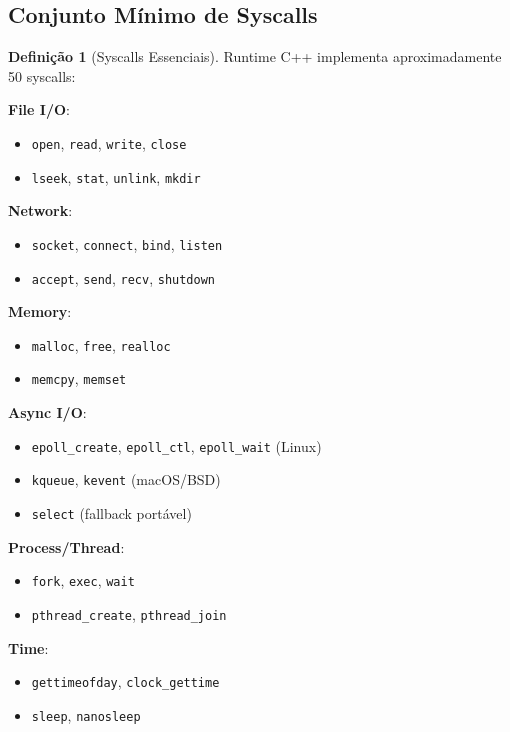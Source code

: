 \documentclass[12pt,a4paper]{article}
\theoremstyle{definition}
\newtheorem{definition}{Definição}[section]
\begin{document}
\subsection{Conjunto Mínimo de Syscalls}

\begin{definition}[Syscalls Essenciais]
Runtime C++ implementa aproximadamente 50 syscalls:

\textbf{File I/O}:
\begin{itemize}[noitemsep]
    \item \texttt{open}, \texttt{read}, \texttt{write}, \texttt{close}
    \item \texttt{lseek}, \texttt{stat}, \texttt{unlink}, \texttt{mkdir}
\end{itemize}

\textbf{Network}:
\begin{itemize}[noitemsep]
    \item \texttt{socket}, \texttt{connect}, \texttt{bind}, \texttt{listen}
    \item \texttt{accept}, \texttt{send}, \texttt{recv}, \texttt{shutdown}
\end{itemize}

\textbf{Memory}:
\begin{itemize}[noitemsep]
    \item \texttt{malloc}, \texttt{free}, \texttt{realloc}
    \item \texttt{memcpy}, \texttt{memset}
\end{itemize}

\textbf{Async I/O}:
\begin{itemize}[noitemsep]
    \item \texttt{epoll\_create}, \texttt{epoll\_ctl}, \texttt{epoll\_wait} (Linux)
    \item \texttt{kqueue}, \texttt{kevent} (macOS/BSD)
    \item \texttt{select} (fallback portável)
\end{itemize}

\textbf{Process/Thread}:
\begin{itemize}[noitemsep]
    \item \texttt{fork}, \texttt{exec}, \texttt{wait}
    \item \texttt{pthread\_create}, \texttt{pthread\_join}
\end{itemize}

\textbf{Time}:
\begin{itemize}[noitemsep]
    \item \texttt{gettimeofday}, \texttt{clock\_gettime}
    \item \texttt{sleep}, \texttt{nanosleep}
\end{itemize}
\end{definition}
\end{document}
